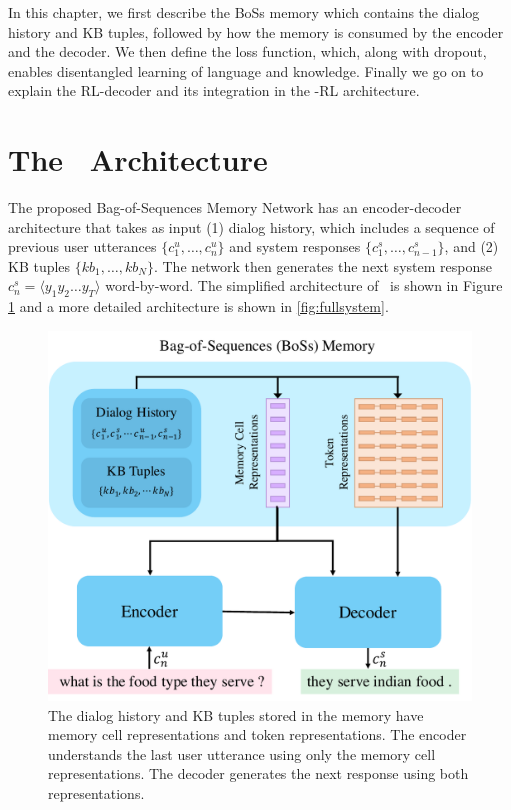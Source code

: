In this chapter, we first describe the {\sc BoSs} memory which contains the dialog history and KB tuples, followed by how the memory is consumed by the encoder and the decoder. We then define the loss function, which, along with dropout, enables disentangled learning of language and knowledge. Finally we go on to explain the RL-decoder and its integration in the \sys -RL architecture.

\section{The \sys\ Architecture}
The proposed Bag-of-Sequences Memory Network has an encoder-decoder architecture that takes as input (1) dialog history, which includes a sequence of previous user utterances $\{c_1^u, \ldots, c_{n}^u\}$ and system responses $\{c_1^s, \ldots, c_{n-1}^s\}$, and (2) KB tuples $\{kb_1, \ldots, kb_{N}\}$. The network then generates the next system response $c_n^s=\langle y_1 y_2 \ldots y_T \rangle$ word-by-word. The simplified architecture of \sys\ is shown in Figure \ref{fig:simsystem} and a more detailed architecture is shown in \ref{fig:fullsystem}.

\begin{figure}[t]
\centering
\includegraphics[scale=0.5]{assets/paper_arch.pdf}
\caption{The dialog history and KB tuples stored in the memory have memory cell representations and token representations. The encoder understands the last user utterance using only the memory cell representations. The decoder generates the next response using both representations.}
\label{fig:simsystem}
\end{figure}

